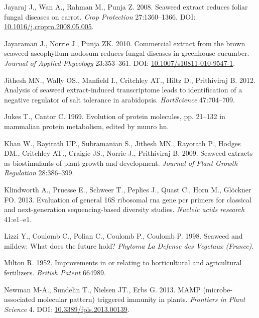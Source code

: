 \documentclass[11pt,]{article}
\begin{document}
\hypertarget{ref-Jayaraj2008}{}
Jayaraj J., Wan A., Rahman M., Punja Z. 2008. Seaweed extract reduces
foliar fungal diseases on carrot. \emph{Crop Protection} 27:1360--1366.
DOI:
\href{https://doi.org/10.1016/j.cropro.2008.05.005}{10.1016/j.cropro.2008.05.005}.

\hypertarget{ref-Jayaraman2010}{}
Jayaraman J., Norrie J., Punja ZK. 2010. Commercial extract from the
brown seaweed ascophyllum nodosum reduces fungal diseases in greenhouse
cucumber. \emph{Journal of Applied Phycology} 23:353--361. DOI:
\href{https://doi.org/10.1007/s10811-010-9547-1}{10.1007/s10811-010-9547-1}.

\hypertarget{ref-jithesh2012analysis}{}
Jithesh MN., Wally OS., Manfield I., Critchley AT., Hiltz D.,
Prithiviraj B. 2012. Analysis of seaweed extract-induced transcriptome
leads to identification of a negative regulator of salt tolerance in
arabidopsis. \emph{HortScience} 47:704--709.

\hypertarget{ref-jukes1969evolution}{}
Jukes T., Cantor C. 1969. Evolution of protein molecules, pp. 21--132 in
mammalian protein metabolism, edited by munro hn.

\hypertarget{ref-khan2009seaweed}{}
Khan W., Rayirath UP., Subramanian S., Jithesh MN., Rayorath P., Hodges
DM., Critchley AT., Craigie JS., Norrie J., Prithiviraj B. 2009. Seaweed
extracts as biostimulants of plant growth and development. \emph{Journal
of Plant Growth Regulation} 28:386--399.

\hypertarget{ref-klindworth2013evaluation}{}
Klindworth A., Pruesse E., Schweer T., Peplies J., Quast C., Horn M.,
Glöckner FO. 2013. Evaluation of general 16S ribosomal rna gene pcr
primers for classical and next-generation sequencing-based diversity
studies. \emph{Nucleic acids research} 41:e1--e1.

\hypertarget{ref-lizzi1998seaweed}{}
Lizzi Y., Coulomb C., Polian C., Coulomb P., Coulomb P. 1998. Seaweed
and mildew: What does the future hold? \emph{Phytoma La Defense des
Vegetaux (France)}.

\hypertarget{ref-milton1952improvements}{}
Milton R. 1952. Improvements in or relating to horticultural and
agricultural fertilizers. \emph{British Patent} 664989.

\hypertarget{ref-Newman2013}{}
Newman M-A., Sundelin T., Nielsen JT., Erbs G. 2013. MAMP
(microbe-associated molecular pattern) triggered immunity in plants.
\emph{Frontiers in Plant Science} 4. DOI:
\href{https://doi.org/10.3389/fpls.2013.00139}{10.3389/fpls.2013.00139}.
\end{document}
